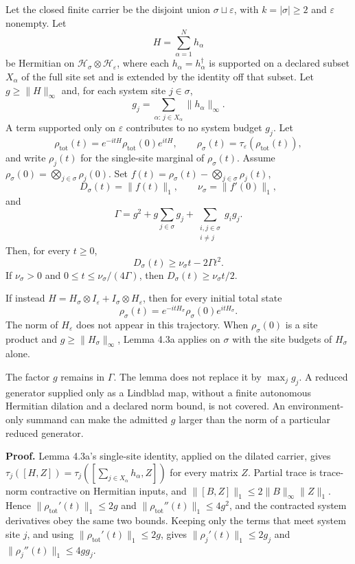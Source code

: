 \documentclass[
  11pt,
]{article}
\begin{document}
Let the closed finite carrier be the disjoint union
\(\sigma\sqcup\varepsilon\), with \(k=|\sigma|\ge 2\) and \(\varepsilon\)
nonempty. Let
\[
H=\sum_{\alpha=1}^{N}h_\alpha
\]
be Hermitian on \(\mathcal H_\sigma\otimes\mathcal H_\varepsilon\), where
each \(h_\alpha=h_\alpha^\dagger\) is supported on a declared subset
\(X_\alpha\) of the full site set and is extended by the identity off
that subset. Let \(g\ge\|H\|_\infty\) and, for each system site
\(j\in\sigma\),
\[
g_j=\sum_{\alpha:\,j\in X_\alpha}\|h_\alpha\|_\infty.
\]
A term supported only on \(\varepsilon\) contributes to no system budget
\(g_j\). Let
\[
\rho_{\mathrm{tot}}(t)=e^{-itH}\rho_{\mathrm{tot}}(0)e^{itH},\qquad
\rho_\sigma(t)=\tau_\varepsilon(\rho_{\mathrm{tot}}(t)),
\]
and write \(\rho_j(t)\) for the single-site marginal of
\(\rho_\sigma(t)\). Assume
\(\rho_\sigma(0)=\bigotimes_{j\in\sigma}\rho_j(0)\). Set
\(f(t)=\rho_\sigma(t)-\bigotimes_{j\in\sigma}\rho_j(t)\),
\[
D_\sigma(t)=\|f(t)\|_1,\qquad
\nu_\sigma=\|f'(0)\|_1,
\]
and
\[
\Gamma
=g^2+g\sum_{j\in\sigma}g_j+\sum_{\substack{i,j\in\sigma\\ i\ne j}}g_ig_j.
\]
Then, for every \(t\ge 0\),
\[
D_\sigma(t)\ge\nu_\sigma t-2\Gamma t^2.
\]
If \(\nu_\sigma>0\) and \(0\le t\le\nu_\sigma/(4\Gamma)\), then
\(D_\sigma(t)\ge\nu_\sigma t/2\).

If instead \(H=H_\sigma\otimes I_\varepsilon+I_\sigma\otimes H_\varepsilon\),
then for every initial total state
\[
\rho_\sigma(t)=e^{-itH_\sigma}\rho_\sigma(0)e^{itH_\sigma}.
\]
The norm of \(H_\varepsilon\) does not appear in this trajectory. When
\(\rho_\sigma(0)\) is a site product and \(g\ge\|H_\sigma\|_\infty\),
Lemma 4.3a applies on \(\sigma\) with the site budgets of \(H_\sigma\)
alone.

The factor \(g\) remains in \(\Gamma\). The lemma does not replace it
by \(\max_j g_j\). A reduced generator supplied only as a Lindblad map,
without a finite autonomous Hermitian dilation and a declared norm bound, is not
covered. An environment-only summand can make the admitted \(g\) larger
than the norm of a particular reduced generator.

\textbf{Proof.} Lemma 4.3a's single-site identity, applied on the dilated
carrier, gives
\(\tau_j([H,Z])=\tau_j([\sum_{j\in X_\alpha}h_\alpha,Z])\)
for every matrix \(Z\). Partial trace is trace-norm contractive on
Hermitian inputs, and
\(\|[B,Z]\|_1\le 2\|B\|_\infty\|Z\|_1\). Hence
\(\|\rho_{\mathrm{tot}}'(t)\|_1\le 2g\) and
\(\|\rho_{\mathrm{tot}}''(t)\|_1\le 4g^2\), and the contracted system
derivatives obey the same two bounds. Keeping only the terms that meet
system site \(j\), and using
\(\|\rho_{\mathrm{tot}}'(t)\|_1\le 2g\), gives
\(\|\rho_j'(t)\|_1\le 2g_j\) and \(\|\rho_j''(t)\|_1\le 4gg_j\).
\end{document}

